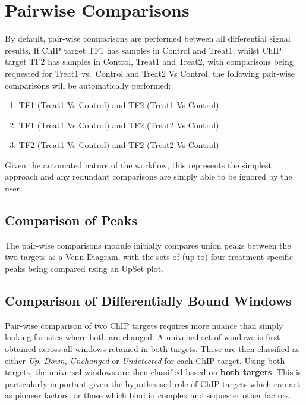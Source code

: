 \documentclass[
]{book}
\providecommand{\tightlist}{%
  \setlength{\itemsep}{0pt}\setlength{\parskip}{0pt}}
\begin{document}
\hypertarget{pairwise-comparisons}{%
\section{Pairwise Comparisons}\label{pairwise-comparisons}}

By default, pair-wise comparisons are performed between all differential signal results.
If ChIP target TF1 has samples in Control and Treat1, whilst ChIP target TF2 has samples in Control, Treat1 and Treat2, with comparisons being requested for Treat1 vs.~Control and Treat2 Vs Control, the following pair-wise comparisons will be automatically performed:

\begin{enumerate}
\def\labelenumi{\arabic{enumi}.}
\tightlist
\item
  TF1 (Treat1 Vs Control) and TF2 (Treat1 Vs Control)
\item
  TF1 (Treat1 Vs Control) and TF2 (Treat2 Vs Control)
\item
  TF2 (Treat1 Vs Control) and TF2 (Treat2 Vs Control)
\end{enumerate}

Given the automated nature of the workflow, this represents the simplest approach and any redundant comparisons are simply able to be ignored by the user.

\hypertarget{comparison-of-peaks}{%
\subsection*{Comparison of Peaks}\label{comparison-of-peaks}}

The pair-wise comparisons module initially compares union peaks between the two targets as a Venn Diagram, with the sets of (up to) four treatment-specific peaks being compared using an UpSet plot.

\hypertarget{comparison-of-differentially-bound-windows}{%
\subsection*{Comparison of Differentially Bound Windows}\label{comparison-of-differentially-bound-windows}}

Pair-wise comparison of two ChIP targets requires more nuance than simply looking for sites where both are changed.
A universal set of windows is first obtained across all windows retained in both targets.
These are then classified as either \emph{Up}, \emph{Down}, \emph{Unchanged} or \emph{Undetected} for each ChIP target.
Using both targets, the universal windows are then classified based on \textbf{both targets}.
This is particularly important given the hypothesised role of ChIP targets which can act as pioneer factors\citep{pioneerfactors}, or those which bind in complex and sequester other factors\citep{hickeynatmed}.
\end{document}
